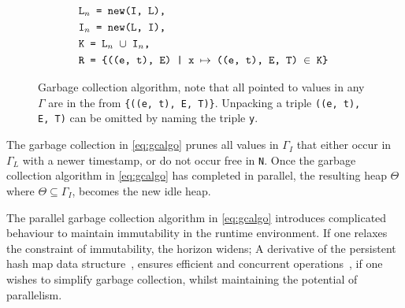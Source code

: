 \begin{figure}
\begin{mdframed}[style=bigbox]
\begin{align}
  &\hspace{0.62cm}\texttt{L$_n$ = new(I, L),}\tag*{}\\
  &\hspace{0.62cm}\texttt{I$_n$ = new(L, I),}\tag*{}\\
  &\hspace{0.62cm}\texttt{K = L$_n$ $\cup$ I$_n$,}\tag*{}\\
  &\hspace{0.62cm}\texttt{R = \{((e, t), E) | x $\mapsto$ ((e, t), E, T) $\in$ K\}} \tag*{}
\end{align}
  \end{mdframed}
  \caption{Garbage collection algorithm, note that all pointed to values in any $\Gamma$ are in the from \texttt{\{((e, t), E, T)\}}. Unpacking a triple \texttt{((e, t), E, T)} can be omitted by naming the triple \texttt{y}.}
  \label{eq:gcalgo}
\end{figure}
The garbage collection in \autoref{eq:gcalgo} prunes all values in $\Gamma_I$ that either occur in $\Gamma_L$ with a newer timestamp, or do not occur free in \texttt{N}.
Once the garbage collection algorithm in \autoref{eq:gcalgo} has completed in parallel, the resulting heap $\Theta$ where $\Theta \subseteq \Gamma_I$, becomes the new idle heap.
\begin{remark}
  The parallel garbage collection algorithm in \autoref{eq:gcalgo} introduces complicated behaviour to maintain immutability in the runtime environment.
  If one relaxes the constraint of immutability, the horizon widens;
  A derivative of the persistent hash map data structure~\cite{bagwell2001ideal}, ensures efficient and concurrent operations~\cite{prokopec2012concurrent}, if one wishes to simplify garbage collection, whilst maintaining the potential of parallelism.
\end{remark}

